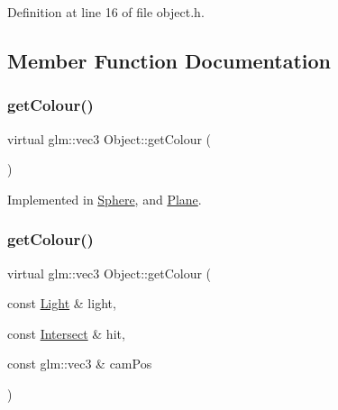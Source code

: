 Definition at line 16 of file object.\+h.



\subsection{Member Function Documentation}
\mbox{\label{class_object_a0a966fb37be861cbaacb834ef7b89d8a}} 
\subsubsection{\texorpdfstring{get\+Colour()}{getColour()}\hspace{0.1cm}{\footnotesize\ttfamily [1/2]}}
{\footnotesize\ttfamily virtual glm\+::vec3 Object\+::get\+Colour (\begin{DoxyParamCaption}{ }\end{DoxyParamCaption})\hspace{0.3cm}{\ttfamily [pure virtual]}}



Implemented in \mbox{\hyperlink{class_sphere_abc6455e04b563fb57b91f12183fa4d18}{Sphere}}, and \mbox{\hyperlink{class_plane_a81494e203b2cd4bf67d00c2503e1929f}{Plane}}.

\mbox{\label{class_object_aac162b545913d7aeab851204d3f04ebf}} 
\subsubsection{\texorpdfstring{get\+Colour()}{getColour()}\hspace{0.1cm}{\footnotesize\ttfamily [2/2]}}
{\footnotesize\ttfamily virtual glm\+::vec3 Object\+::get\+Colour (\begin{DoxyParamCaption}\item[{const \mbox{\hyperlink{class_light}{Light}} \&}]{light,  }\item[{const \mbox{\hyperlink{struct_intersect}{Intersect}} \&}]{hit,  }\item[{const glm\+::vec3 \&}]{cam\+Pos }\end{DoxyParamCaption})\hspace{0.3cm}{\ttfamily [pure virtual]}}



